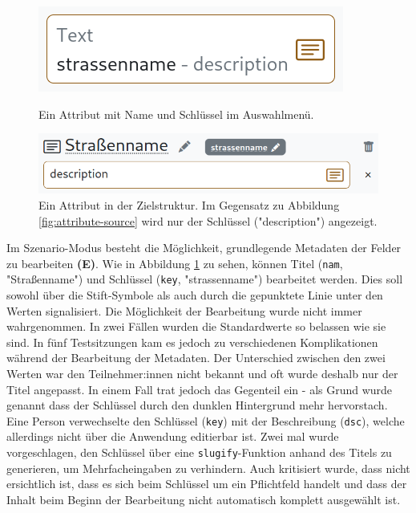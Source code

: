 \begin{figure}[!ht]
  \includegraphics[width=\linewidth]{assets/attribute-source.png}
  \caption{Ein Attribut mit Name und Schlüssel im Auswahlmenü.}
  \label{fig:attribute-source}
  \endminipage
  \hfill
  \includegraphics[width=\linewidth]{assets/attribute-target.png}
  \caption{Ein Attribut in der Zielstruktur. Im Gegensatz zu Abbildung \ref{fig:attribute-source} wird nur der Schlüssel ("description") angezeigt.}
  \label{fig:attribute-target}
  \endminipage
\end{figure}

Im Szenario-Modus besteht die Möglichkeit, grundlegende Metadaten der Felder zu bearbeiten \textbf{(E)}. Wie in Abbildung \ref{fig:attribute-target} zu sehen, können Titel (\texttt{nam}, "Straßenname") und Schlüssel (\texttt{key}, "strassenname") bearbeitet werden. Dies soll sowohl über die Stift-Symbole als auch durch die gepunktete Linie unter den Werten signalisiert. Die Möglichkeit der Bearbeitung wurde nicht immer wahrgenommen. In zwei Fällen wurden die Standardwerte so belassen wie sie sind. In fünf Testsitzungen kam es jedoch zu verschiedenen Komplikationen während der Bearbeitung der Metadaten. Der Unterschied zwischen den zwei Werten war den Teilnehmer:innen nicht bekannt und oft wurde deshalb nur der Titel angepasst. In einem Fall trat jedoch das Gegenteil ein - als Grund wurde genannt dass der Schlüssel durch den dunklen Hintergrund mehr hervorstach. Eine Person verwechselte den Schlüssel (\texttt{key}) mit der Beschreibung (\texttt{dsc}), welche allerdings nicht über die Anwendung editierbar ist. Zwei mal wurde vorgeschlagen, den Schlüssel über eine \texttt{slugify}-Funktion anhand des Titels zu generieren, um Mehrfacheingaben zu verhindern. Auch kritisiert wurde, dass nicht ersichtlich ist, dass es sich beim Schlüssel um ein Pflichtfeld handelt und dass der Inhalt beim Beginn der Bearbeitung nicht automatisch komplett ausgewählt ist.

